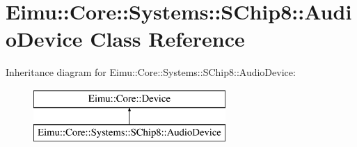 \hypertarget{class_eimu_1_1_core_1_1_systems_1_1_s_chip8_1_1_audio_device}{
\section{Eimu::Core::Systems::SChip8::AudioDevice Class Reference}
\label{class_eimu_1_1_core_1_1_systems_1_1_s_chip8_1_1_audio_device}
}
Inheritance diagram for Eimu::Core::Systems::SChip8::AudioDevice:\begin{figure}[H]
\begin{center}
\leavevmode
\includegraphics[height=2.000000cm]{class_eimu_1_1_core_1_1_systems_1_1_s_chip8_1_1_audio_device}
\end{center}
\end{figure}
